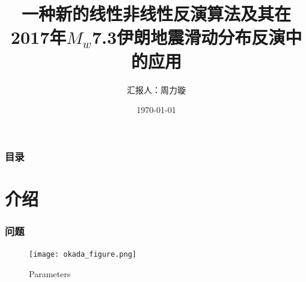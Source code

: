 ﻿\documentclass{beamer}
\title[M-V]{一种新的线性非线性反演算法及其在2017年$M_w$7.3伊朗地震滑动分布反演中的应用}
\author{汇报人：周力璇}
\institute[武汉大学]
{
武汉大学 \\
\medskip
\textit{schevan@163.com}
}
\date{\today}
\begin{document}
\begin{frame}
\titlepage
\end{frame}


\begin{frame}
\frametitle{目录}
\tableofcontents
\end{frame}

\section{介绍}
\begin{frame}
\frametitle{问题}

\begin{figure}
  \centering
  \texttt{[image: okada\_figure.png]}\\
  \caption{Parameters}\label{fig_okada}
\end{figure}

\end{frame}
\end{document}
